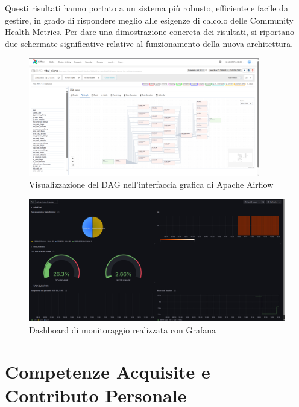 Questi risultati hanno portato a un sistema più robusto, efficiente e facile da gestire, in grado di rispondere meglio alle esigenze di calcolo delle Community Health Metrics.
Per dare una dimostrazione concreta dei risultati, si riportano due schermate significative 
relative al funzionamento della nuova architettura.

\begin{figure}[htbp]
    \centering
    \includegraphics[width=0.9\textwidth]{img/airflowscreen.png}
    \caption{Visualizzazione del DAG nell'interfaccia grafica di Apache Airflow}
    \label{fig:airflowscreen}
\end{figure}

\begin{figure}[htbp]
    \centering
    \includegraphics[width=\textwidth]{img/grafanadash.png}
    \caption{Dashboard di monitoraggio realizzata con Grafana}
    \label{fig:grafanadash}
\end{figure}

\newpage



\section{Competenze Acquisite e Contributo Personale}
\label{sec:competenzeacquisitecontributopersonale}

